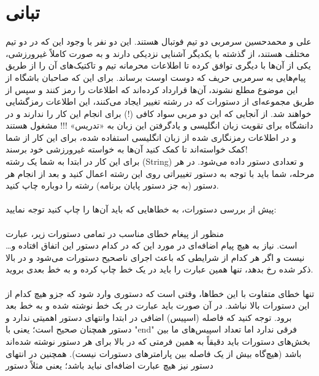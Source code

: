 \documentclass[]{article}
\begin{document}
\newpage
\section{تبانی}


علی و محمدحسین سرمربی دو تیم فوتبال هستند. این دو نفر با وجود این که در دو تیم مختلف هستند، از گذشته با یکدیگر آشنایی نزدیکی دارند و به صورت کاملاً غیرورزشی، یکی از آن‌ها با دیگری توافق کرده تا اطلاعات محرمانه تیم و تاکتیک‌های آن را از طریق پیام‌هایی به سرمربی حریف که دوست اوست برساند. برای این که صاحبان باشگاه از این موضوع مطلع نشوند، آن‌ها قرارداد کرده‌اند که اطلاعات را رمز کنند و سپس از طریق مجموعه‌ای از دستورات که در رشته تغییر ایجاد می‌کنند، این اطلاعات رمزگشایی خواهند شد. از آنجایی که این دو مربی سواد کافی (!) برای انجام این کار را ندارند و در دانشگاه برای تقویت زبان انگلیسی و یادگرفتن این زبان به «تدریس» !!! مشغول هستند و در اطلاعات رمزنگاری شده از زبان انگلیسی استفاده شده، برای این کار از شما کمک خواسته‌اند تا کمک کنید آن‌ها به خواسته غیرورزشی خود برسند!\\
برای این کار در ابتدا به شما یک رشته (String) و تعدادی دستور داده می‌شود. در هر مرحله، شما باید با توجه به دستور تغییراتی روی این رشته اعمال کنید و بعد از انجام هر دستور (به جز دستور پایان برنامه) رشته را دوباره چاپ کنید.\\\\
پیش از بررسی دستورات، به خطاهایی که باید آن‌ها را چاپ کنید توجه نمایید:\\\\
منظور از پیغام خطای مناسب در تمامی دستورات زیر، عبارت 
\\
است. نیاز به هیچ پیام اضافه‌ای در مورد این که در کدام دستور این اتفاق افتاده و… نیست و اگر هر کدام از شرایطی که باعث اجرای ناصحیح دستورات می‌شود و در بالا ذکر شده رخ بدهد، تنها همین عبارت را باید در یک خط چاپ کرده و به خط بعدی بروید.\\\\
تنها خطای متفاوت با این خطاها، وقتی است که دستوری وارد شود که جزو هیچ کدام از این دستورات بالا نباشد. در آن صورت باید عبارت 
 در یک خط نوشته شده و به خط بعد برود. توجه کنید که فاصله (اسپیس) اضافی در ابتدا وانتهای دستور اهمیتی ندارد و دستور همچنان صحیح است؛ یعنی 
  با "end" فرقی ندارد اما تعداد اسپیس‌های ما بین بخش‌های دستورات باید دقیقاً به همین فرمتی که در بالا برای هر دستور نوشته شده‌اند باشد (هیچ‌گاه بیش از یک فاصله بین پارامترهای دستورات نیست). همچنین در انتهای دستور نیز هیچ عبارت اضافه‌ای نباید باشد؛ یعنی مثلاً دستور 
\end{document}
